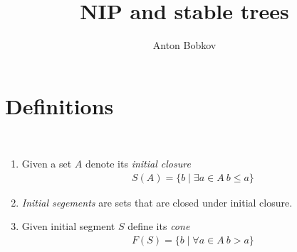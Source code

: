 \documentclass{amsart}
\begin{document}
\title{NIP and stable trees}
\author{Anton Bobkov}

\maketitle

\section{Definitions}

\begin{Definition}\ 
	\begin{enumerate}
		\item Given a set $A$ denote its \emph{initial closure} 
		\begin{align*}
			S(A) = \{b \mid \exists a \in A \ b \leq a\}
		\end{align*}
		\item \emph{Initial segements} are sets that are closed under initial closure.
		\item Given initial segment $S$ define its \emph{cone}
		\begin{align*}
			F(S) = \{b \mid \forall a \in A \ b > a\}
		\end{align*}
	\end{enumerate}
\end{Definition}
\end{document}
